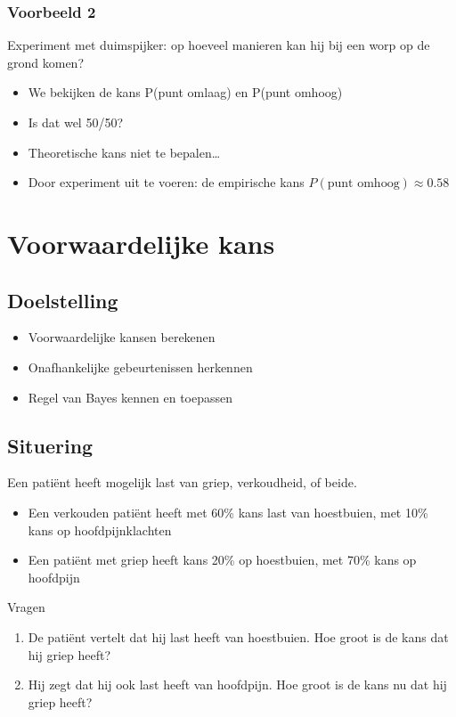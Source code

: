 \documentclass{article}
\begin{document}
\subsubsection{Voorbeeld 2}

Experiment met duimspijker: op hoeveel manieren kan hij bij een worp op de grond komen?

\begin{itemize}
    \item We bekijken de kans P(punt omlaag) en P(punt omhoog)
    \item Is dat wel 50/50?
    \item Theoretische kans niet te bepalen\dots
    \item Door experiment uit te voeren: de empirische kans $P(\text{punt omhoog}) \approx 0.58$
\end{itemize}

\section{Voorwaardelijke kans}

\subsection{Doelstelling}

\begin{itemize}
    \item Voorwaardelijke kansen berekenen
    \item Onafhankelijke gebeurtenissen herkennen
    \item Regel van Bayes kennen en  toepassen
\end{itemize}

\subsection{Situering}

Een patiënt heeft mogelijk last van griep, verkoudheid, of beide.

\begin{itemize}
    \item Een verkouden patiënt heeft met 60\% kans last van hoestbuien, met 10\% kans op hoofdpijnklachten
    \item Een patiënt met griep heeft kans 20\% op hoestbuien, met 70\% kans op hoofdpijn
\end{itemize}

Vragen

\begin{enumerate}
    \item De patiënt vertelt dat hij last heeft van hoestbuien. Hoe groot is de kans dat hij griep heeft?
    \item Hij zegt dat hij ook last heeft van hoofdpijn. Hoe groot is de kans nu dat hij griep heeft?
\end{enumerate}
\end{document}
